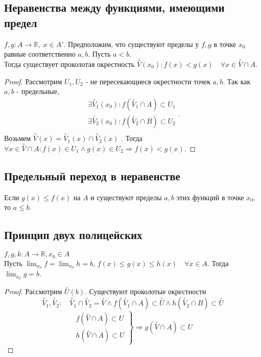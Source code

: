 \documentclass[11pt]{book}
\newcommand{\R}{\mathbb{R}}
\renewcommand{\le}{\leqslant}
\theoremstyle{definition}
\theoremstyle{plain}
\theoremstyle{plain}
\theoremstyle{definition}
\theoremstyle{remark}
\begin{document}
\subsection{Неравенства между функциями, имеющими предел}
\begin{thm}
    $f, g :A \to \R, ~x \in A'$. Предположим, что существуют пределы у $f, g$ в точке $x_0$ равные соответственно $a, b$. Пусть $a<b$. \\
    Тогда существует проколотая окрестность  $\stackrel \circ V (x_0): f(x) < g(x) \quad \forall x \in \stackrel \circ V \cap A$.
\end{thm}
\begin{proof}
    Рассмотрим $U_1 , U_2$ - не пересекающиеся окрестности точек $a, b$. Так как $a, b$ - предельные, \[
	\begin{array}{c}
	    \exists \stackrel{\circ} V_1 (x_0): f(\stackrel{\circ} V_1 \cap A) \subset U_1 \\
	    \exists \stackrel{\circ} V_2 (x_0): f(\stackrel{\circ} V_2 \cap B) \subset U_2 \\
    \end{array}
    .\] 
    Возьмем $\stackrel{\circ} V(x) = \stackrel{\circ} V_1(x) \cap \stackrel{\circ} V_2(x)$ . Тогда $\forall x \in \stackrel \circ V \cap A: f(x) \in  U_1 \wedge g(x) \in  U_2 \Rightarrow f(x) < g(x)$.
\end{proof}
\subsection{Предельный переход в неравенстве}\label{ques_18}
\begin{thm}
    Если  $ g(x) \le f(x)$ на $ A$ и существуют пределы $ a, b$ этих функций в точке  $ x_0$, то $ a \le b$.
\end{thm}
\subsection{Принцип двух полицейских}\label{ques_19}
\begin{thm}
     $f, g, k: A \to \R, x_0 \in A$ \\
     Пусть $\lim_{x_0} f = \lim_{x_0} h = b$, $f(x) \le g(x) \le h(x) \quad \forall x \in A$.
     Тогда $\lim_{x_0} g = b$.
\end{thm}
\begin{proof}
    Рассмотрим $\stackrel \circ U(b)$. Существуют проколотые окрестности $$\stackrel \circ V_1, \stackrel \circ V_2:\quad \stackrel \circ V_1 \cap \stackrel \circ V_2  = \stackrel \circ V \wedge 
    f(\stackrel \circ V_1\cap A) \subset \stackrel \circ U \wedge h(\stackrel \circ V_2 \cap B) \subset \stackrel \circ U$$
    $$
    \left . 
    \begin{array}{c}
	f(\stackrel \circ V \cap A) \subset U \\
	h(\stackrel \circ V \cap A) \subset U
    \end{array}
\right \} \Rightarrow g(\stackrel \circ V \cap A) \subset U
    $$
\end{proof}
\end{document}
